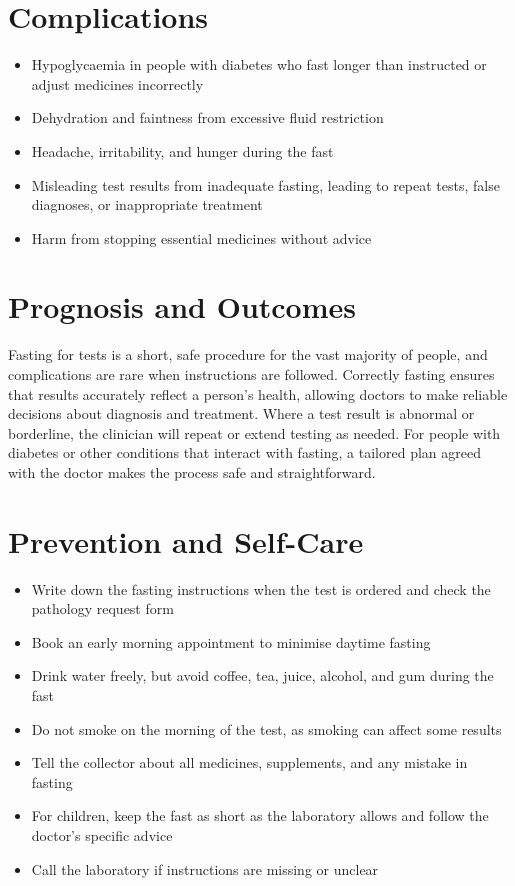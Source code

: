 \section*{Complications}
\begin{itemize}
    \item Hypoglycaemia in people with diabetes who fast longer than instructed or adjust medicines incorrectly
    \item Dehydration and faintness from excessive fluid restriction
    \item Headache, irritability, and hunger during the fast
    \item Misleading test results from inadequate fasting, leading to repeat tests, false diagnoses, or inappropriate treatment
    \item Harm from stopping essential medicines without advice
\end{itemize}

\section*{Prognosis and Outcomes}
Fasting for tests is a short, safe procedure for the vast majority of people, and complications are rare when instructions are followed. Correctly fasting ensures that results accurately reflect a person's health, allowing doctors to make reliable decisions about diagnosis and treatment. Where a test result is abnormal or borderline, the clinician will repeat or extend testing as needed. For people with diabetes or other conditions that interact with fasting, a tailored plan agreed with the doctor makes the process safe and straightforward.

\section*{Prevention and Self-Care}
\begin{itemize}
    \item Write down the fasting instructions when the test is ordered and check the pathology request form
    \item Book an early morning appointment to minimise daytime fasting
    \item Drink water freely, but avoid coffee, tea, juice, alcohol, and gum during the fast
    \item Do not smoke on the morning of the test, as smoking can affect some results
    \item Tell the collector about all medicines, supplements, and any mistake in fasting
    \item For children, keep the fast as short as the laboratory allows and follow the doctor's specific advice
    \item Call the laboratory if instructions are missing or unclear
\end{itemize}

